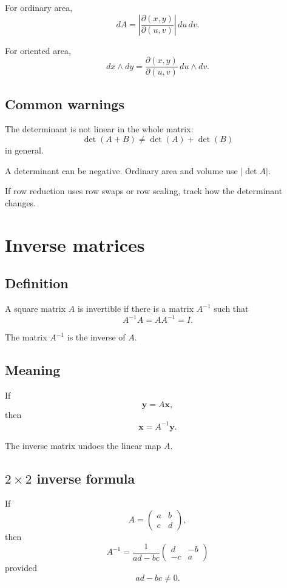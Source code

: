 For ordinary area,
\[
\boxed{
    dA
    =
    \left|
    \frac{\partial(x,y)}{\partial(u,v)}
    \right|
    \,du\,dv.
}
\]

For oriented area,
\[
\boxed{
    dx\wedge dy
    =
    \frac{\partial(x,y)}{\partial(u,v)}
    \,du\wedge dv.
}
\]

\subsection*{Common warnings}

The determinant is not linear in the whole matrix:
\[
    \det(A+B)\ne\det(A)+\det(B)
\]
in general.

A determinant can be negative.  Ordinary area and volume use \(|\det A|\).

If row reduction uses row swaps or row scaling, track how the determinant changes.

\section{Inverse matrices}
\label{app:C.4}

\subsection*{Definition}

A square matrix \(A\) is invertible if there is a matrix \(A^{-1}\) such that
\[
\boxed{
    A^{-1}A=AA^{-1}=I.
}
\]

The matrix \(A^{-1}\) is the inverse of \(A\).

\subsection*{Meaning}

If
\[
    \mathbf y=A\mathbf x,
\]
then
\[
\boxed{
    \mathbf x=A^{-1}\mathbf y.
}
\]

The inverse matrix undoes the linear map \(A\).

\subsection*{\(2\times2\) inverse formula}

If
\[
    A=
    \begin{pmatrix}
    a&b\\
    c&d
    \end{pmatrix},
\]
then
\[
\boxed{
    A^{-1}
    =
    \frac{1}{ad-bc}
    \begin{pmatrix}
    d&-b\\
    -c&a
    \end{pmatrix}
}
\]
provided
\[
\boxed{
    ad-bc\ne0.
}
\]

